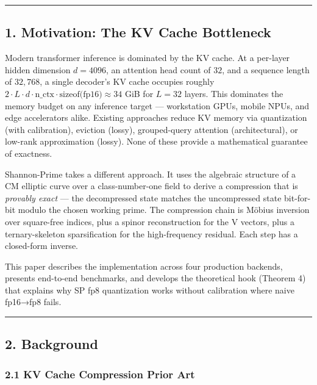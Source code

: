 \documentclass[
  11pt,
]{article}
\begin{document}
\begin{center}\rule{0.5\linewidth}{0.5pt}\end{center}

\hypertarget{motivation-the-kv-cache-bottleneck}{%
\subsection{1. Motivation: The KV Cache
Bottleneck}\label{motivation-the-kv-cache-bottleneck}}

Modern transformer inference is dominated by the KV cache. At a
per-layer hidden dimension \(d = 4096\), an attention head count of
\(32\), and a sequence length of \(32{,}768\), a single decoder's KV
cache occupies roughly
\(2 \cdot L \cdot d \cdot \text{n\_ctx} \cdot \text{sizeof(fp16)} \approx 34\)
GiB for \(L = 32\) layers. This dominates the memory budget on any
inference target --- workstation GPUs, mobile NPUs, and edge
accelerators alike. Existing approaches reduce KV memory via
quantization (with calibration), eviction (lossy), grouped-query
attention (architectural), or low-rank approximation (lossy). None of
these provide a mathematical guarantee of exactness.

Shannon-Prime takes a different approach. It uses the algebraic
structure of a CM elliptic curve over a class-number-one field to derive
a compression that is \emph{provably exact} --- the decompressed state
matches the uncompressed state bit-for-bit modulo the chosen working
prime. The compression chain is Möbius inversion over square-free
indices, plus a spinor reconstruction for the V vectors, plus a
ternary-skeleton sparsification for the high-frequency residual. Each
step has a closed-form inverse.

This paper describes the implementation across four production backends,
presents end-to-end benchmarks, and develops the theoretical hook
(Theorem 4) that explains why SP fp8 quantization works without
calibration where naive fp16→fp8 fails.

\begin{center}\rule{0.5\linewidth}{0.5pt}\end{center}

\hypertarget{background}{%
\subsection{2. Background}\label{background}}

\hypertarget{kv-cache-compression-prior-art}{%
\subsubsection{2.1 KV Cache Compression Prior
Art}\label{kv-cache-compression-prior-art}}
\end{document}
